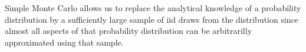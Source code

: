 Simple Monte Carlo allows us to replace the analytical knowledge of a probability distribution by a sufficiently large sample of iid draws from the distribution 
since almost all aspects of that probability distribution can be arbitrarilly approximated using that sample.


